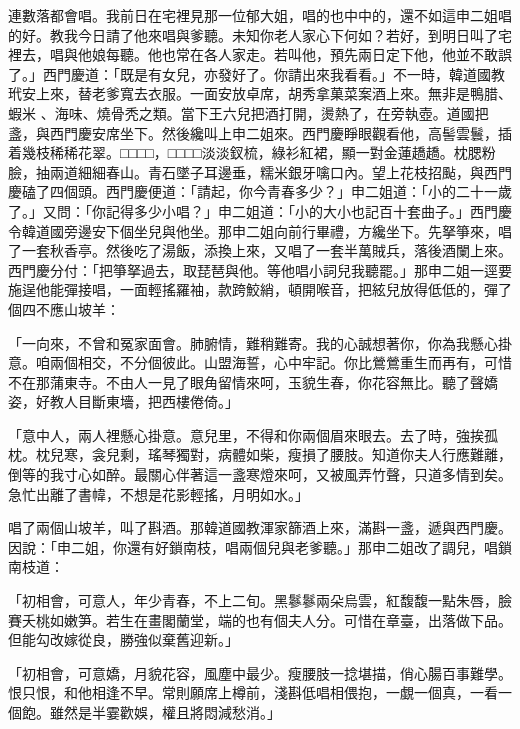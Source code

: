 連數落都會唱。我前日在宅裡見那一位郁大姐，唱的也中中的，還不如這申二姐唱的好。教我今日請了他來唱與爹聽。未知你老人家心下何如？若好，到明日叫了宅裡去，唱與他娘每聽。他也常在各人家走。若叫他，預先兩日定下他，他並不敢誤了。」西門慶道：「既是有女兒，亦發好了。你請出來我看看。」不一時，韓道國教玳安上來，替老爹寬去衣服。一面安放卓席，胡秀拿菓菜案酒上來。無非是鴨腊、蝦米 、海味、燒骨秃之類。當下王六兒把酒打開，燙熱了，在旁執壺。道國把盞，與西門慶安席坐下。然後纔叫上申二姐來。西門慶睜眼觀看他，高髻雲鬟，插着幾枝稀稀花翠。□□□□，□□□□淡淡釵梳，綠衫紅裙，顯一對金蓮趫趫。枕腮粉臉，抽兩道細細春山。青石墜子耳邊垂，糯米銀牙噙口內。望上花枝招颭，與西門慶磕了四個頭。西門慶便道：「請起，你今青春多少？」申二姐道：「小的二十一歲了。」又問：「你記得多少小唱？」申二姐道：「小的大小也記百十套曲子。」西門慶令韓道國旁邊安下個坐兒與他坐。那申二姐向前行畢禮，方纔坐下。先拏箏來，唱了一套秋香亭。然後吃了湯飯，添換上來，又唱了一套半萬賊兵，落後酒闌上來。西門慶分付：「把箏拏過去，取琵琶與他。等他唱小詞兒我聽罷。」那申二姐一逕要施逞他能彈接唱，一面輕搖羅袖，款跨鮫綃，頓開喉音，把絃兒放得低低的，彈了個四不應山坡羊：

「一向來，不曾和冤家面會。肺腑情，難稍難寄。我的心誠想著你，你為我懸心掛意。咱兩個相交，不分個彼此。山盟海誓，心中牢記。你比鶯鶯重生而再有，可惜不在那蒲東寺。不由人一見了眼角留情來呵，玉貌生春，你花容無比。聽了聲嬌姿，好教人目斷東墻，把西樓倦倚。」

「意中人，兩人裡懸心掛意。意兒里，不得和你兩個眉來眼去。去了時，強挨孤枕。枕兒寒，衾兒剩，瑤琴獨對，病體如柴，瘦損了腰肢。知道你夫人行應難離，倒等的我寸心如醉。最關心伴著這一盞寒燈來呵，又被風弄竹聲，只道多情到矣。急忙出離了書幃，不想是花影輕搖，月明如水。」

唱了兩個山坡羊，叫了斟酒。那韓道國教渾家篩酒上來，滿斟一盞，遞與西門慶。因說：「申二姐，你還有好鎖南枝，唱兩個兒與老爹聽。」那申二姐改了調兒，唱鎖南枝道：

「初相會，可意人，年少青春，不上二旬。黑鬖鬖兩朵烏雲，紅馥馥一點朱唇，臉賽夭桃如嫩笋。若生在畫閣蘭堂，端的也有個夫人分。可惜在章臺，出落做下品。但能勾改嫁從良，勝強似棄舊迎新。」

「初相會，可意嬌，月貌花容，風塵中最少。瘦腰肢一捻堪描，俏心腸百事難學。恨只恨，和他相逢不早。常則願席上樽前，淺斟低唱相偎抱，一覷一個真，一看一個飽。雖然是半霎歡娛，權且將悶減愁消。」

